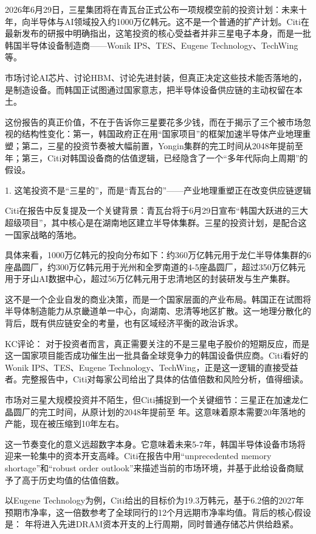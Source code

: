 \documentclass[11pt]{ctexart}
\begin{document}
2026年6月29日，三星集团将在青瓦台正式公布一项规模空前的投资计划：未来十年，向半导体与AI领域投入约1000万亿韩元。这不是一个普通的扩产计划。Citi在最新发布的研报中明确指出，这笔投资的核心受益者并非三星电子本身，而是一批韩国半导体设备制造商——Wonik IPS、TES、Eugene Technology、TechWing等。

市场讨论AI芯片、讨论HBM、讨论先进封装，但真正决定这些技术能否落地的，是制造设备。而韩国正试图通过国家意志，把半导体设备供应链的主动权留在本土。

这份报告的真正价值，不在于告诉你三星要花多少钱，而在于揭示了三个被市场忽视的结构性变化：第一，韩国政府正在用“国家项目”的框架加速半导体产业地理重塑；第二，三星的投资节奏被大幅前置，Yongin集群的完工时间从2048年提前至 年；第三，Citi对韩国设备商的估值逻辑，已经隐含了一个“多年代际向上周期”的假设。

1. 这笔投资不是“三星的”，而是“青瓦台的”——产业地理重塑正在改变供应链逻辑

Citi在报告中反复提及一个关键背景：青瓦台将于6月29日宣布“韩国大跃进的三大超级项目”，其中核心是在湖南地区建立半导体集群。三星的投资计划，是配合这一国家战略的落地。

具体来看，1000万亿韩元的投向分布如下：约360万亿韩元用于龙仁半导体集群的6座晶圆厂，约300万亿韩元用于光州和全罗南道的4-5座晶圆厂，超过350万亿韩元用于牙山AI数据中心，超过56万亿韩元用于忠清地区的封装研发与生产集群。

这不是一个企业自发的商业决策，而是一个国家层面的产业布局。韩国正在试图将半导体制造能力从京畿道单一中心，向湖南、忠清等地区扩散。这一地理分散化的背后，既有供应链安全的考量，也有区域经济平衡的政治诉求。

KC评论： 对于投资者而言，真正需要关注的不是三星电子股价的短期反应，而是这一国家项目能否成功催生出一批具备全球竞争力的韩国设备供应商。Citi看好的Wonik IPS、TES、Eugene Technology、TechWing，正是这一逻辑的直接受益者。完整报告中，Citi对每家公司给出了具体的估值倍数和风险分析，值得细读。

市场对三星大规模投资并不陌生，但Citi捕捉到一个关键细节：三星正在加速龙仁晶圆厂的完工时间，从原计划的2048年提前至 年。这意味着原本需要20年落地的产能，现在被压缩到10年左右。

这一节奏变化的意义远超数字本身。它意味着未来5-7年，韩国半导体设备市场将迎来一轮集中的资本开支高峰。Citi在报告中用“unprecedented memory shortage”和“robust order outlook”来描述当前的市场环境，并基于此给设备商赋予了高于历史均值的估值倍数。

以Eugene Technology为例，Citi给出的目标价为19.3万韩元，基于6.2倍的2027年预期市净率，这一倍数参考了全球同行的12个月远期市净率均值。背后的核心假设是： 年将进入先进DRAM资本开支的上行周期，同时普通存储芯片供给趋紧。
\end{document}
